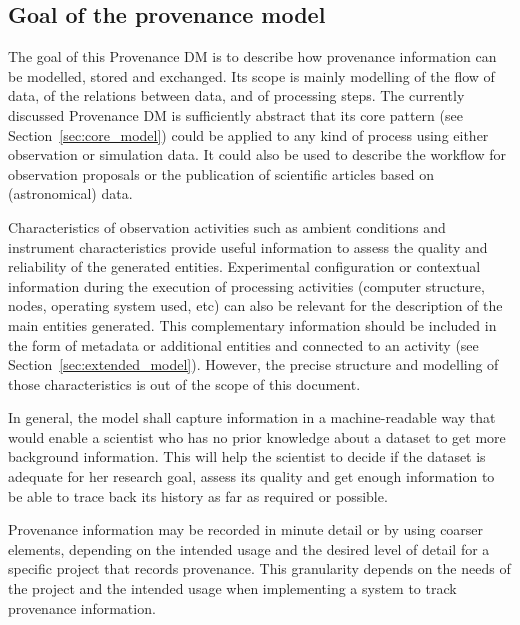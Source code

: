 

\subsection{Goal of the provenance model}
\label{sec:goals}

The goal of this Provenance DM is to describe how provenance information
can be modelled, stored and exchanged. Its scope
is mainly modelling of the flow of data, of the relations between data,
and of processing steps. The currently discussed Provenance DM is sufficiently abstract that its core pattern (see Section~\ref{sec:core_model}) could be applied to any kind of process using either observation or simulation data.
It could also be used to describe the workflow for observation proposals or the publication of scientific articles based on (astronomical) data.

Characteristics of observation activities such as ambient conditions and
instrument characteristics provide useful information to assess the quality and reliability of the generated entities. 
Experimental configuration or contextual information during
the execution of processing activities (computer structure, nodes, operating
system used, etc) can also be relevant for the description of the main entities generated. This complementary information should be included in the form of metadata or additional entities and connected to an activity (see Section~\ref{sec:extended_model}). However, the precise structure and modelling of those characteristics is out of the scope of this document. 

In general, the model shall capture information in a machine-readable way that would enable a scientist who has no prior knowledge about a dataset to get more background information. 
This will help the scientist to decide if the dataset 
is adequate for her research goal, assess its quality and get enough information
to be able to trace back its history as far as required or possible. 

Provenance information may be recorded in minute detail or by using coarser
elements, depending on the intended usage and the desired level of detail
for a specific project that records provenance. 
This granularity depends on the needs of the project and the intended usage when implementing a system to track provenance information.

